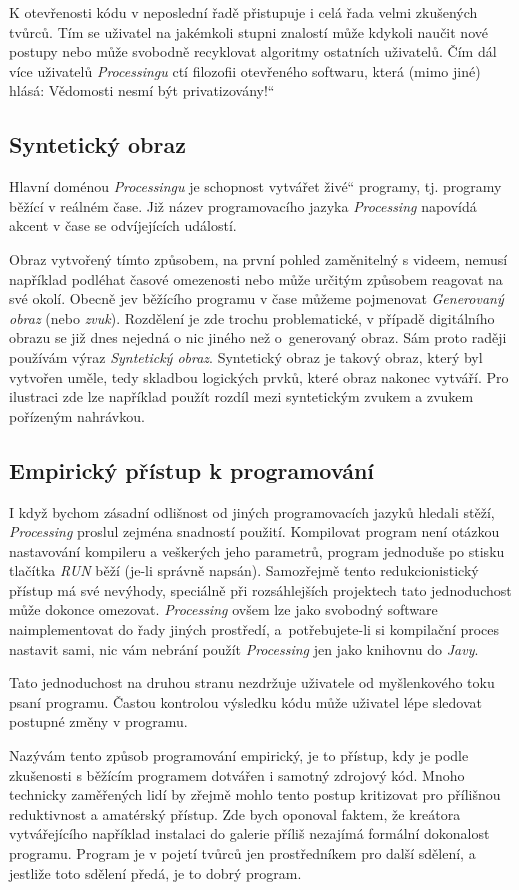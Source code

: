 \documentclass[10pt,twoside=true,open=right,cleardoublepage=empty,chapterprefix=true]{scrbook}
\renewcommand\uv[1]{\quotedblbase #1\textquotedblleft}%
\newcommand{\pododdil}[1]{\subsection{#1}\index{#1}\label{#1}}
\newcommand{\lnb}{\linebreak}
\begin{document}
K otevřenosti kódu v neposlední řadě přistupuje i celá řada velmi zkušených tvůrců. Tím se uživatel na jakémkoli stupni znalostí může kdykoli naučit nové postupy nebo může svobodně recyklovat algoritmy ostatních uživatelů. Čím dál více uživatelů {\em Processingu} ctí filozofii otevřeného softwaru, která (mimo jiné) hlásá: \uv{Vědomosti nesmí být privatizovány!}

\pododdil{Syntetický obraz}

Hlavní doménou {\em Processingu} je schopnost vytvářet \uv{živé} programy, \lnb tj. programy běžící v reálném čase. Již název programovacího jazyka {\em Processing} napovídá akcent v čase se odvíjejících událostí.

Obraz vytvořený tímto způsobem, na první pohled zaměnitelný s videem, nemusí například podléhat časové omezenosti nebo může určitým způsobem reagovat na své okolí. Obecně jev běžícího programu v čase můžeme pojmenovat {\em Generovaný obraz} (nebo {\em zvuk}). Rozdělení je zde trochu problematické, v případě digitálního obrazu se již dnes nejedná o nic jiného než o~generovaný obraz. Sám proto raději používám výraz {\em Syntetický obraz}. Syntetický obraz je takový obraz, který byl vytvořen uměle, tedy skladbou logických prvků, které obraz nakonec vytváří. Pro ilustraci zde lze například použít rozdíl mezi syntetickým zvukem a zvukem pořízeným nahrávkou.


\pododdil{Empirický přístup k programování}

	I když bychom zásadní odlišnost od jiných programovacích jazyků hledali stěží, {\em Processing} proslul zejména snadností použití. Kompilovat program není otázkou nastavování kompileru a veškerých jeho parametrů, program jednoduše po stisku tlačítka {\em RUN} běží (je-li správně napsán). Samozřejmě tento redukcionistický přístup má své nevýhody, speciálně při rozsáhlejších projektech tato jednoduchost může dokonce omezovat. {\em Processing} ovšem lze jako svobodný software naimplementovat do řady jiných prostředí, a~potřebujete-li si kompilační proces nastavit sami, nic vám nebrání použít {\em Processing} jen jako knihovnu do {\em Javy}.

Tato jednoduchost na druhou stranu nezdržuje uživatele od myšlenkového toku psaní programu. Častou kontrolou výsledku kódu může uživatel lépe sledovat postupné změny v programu.

Nazývám tento způsob programování empirický, je to přístup, kdy je podle zkušenosti s běžícím programem dotvářen i samotný zdrojový kód. Mnoho technicky zaměřených lidí by zřejmě mohlo tento postup kritizovat pro přílišnou reduktivnost a amatérský přístup. Zde bych oponoval faktem, že kreátora vytvářejícího například instalaci do galerie příliš nezajímá formální dokonalost programu. Program je v pojetí tvůrců jen prostředníkem pro další sdělení, a jestliže toto sdělení předá, je to dobrý program.
\end{document}
